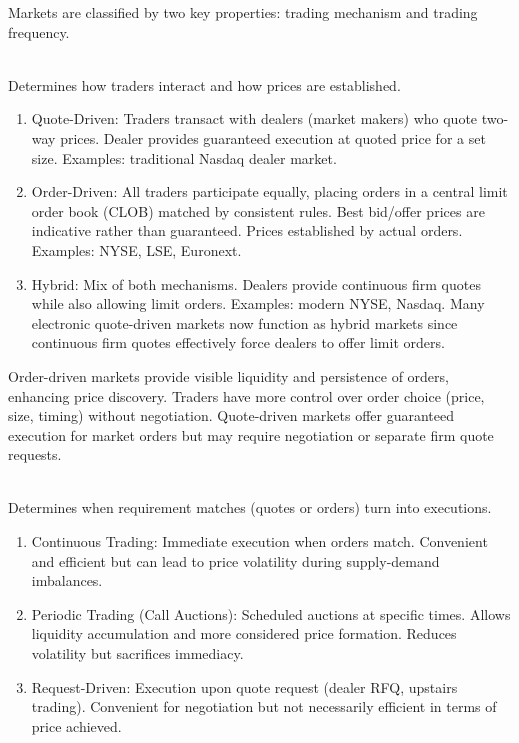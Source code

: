 Markets are classified by two key properties: trading mechanism and trading frequency.

\begin{definition} \\
Determines how traders interact and how prices are established.
\begin{enumerate}[label=\roman*.]
\setlength{\itemsep}{0pt}
\item Quote-Driven: Traders transact with dealers (market makers) who quote two-way prices. Dealer provides guaranteed execution at quoted price for a set size. Examples: traditional Nasdaq dealer market.
\item Order-Driven: All traders participate equally, placing orders in a central limit order book (CLOB) matched by consistent rules. Best bid/offer prices are indicative rather than guaranteed. Prices established by actual orders. Examples: NYSE, LSE, Euronext.
\item Hybrid: Mix of both mechanisms. Dealers provide continuous firm quotes while also allowing limit orders. Examples: modern NYSE, Nasdaq. Many electronic quote-driven markets now function as hybrid markets since continuous firm quotes effectively force dealers to offer limit orders.
\end{enumerate}
Order-driven markets provide visible liquidity and persistence of orders, enhancing price discovery. Traders have more control over order choice (price, size, timing) without negotiation. Quote-driven markets offer guaranteed execution for market orders but may require negotiation or separate firm quote requests.
\end{definition}

\begin{definition} \\
Determines when requirement matches (quotes or orders) turn into executions.
\begin{enumerate}[label=\roman*.]
\setlength{\itemsep}{0pt}
\item Continuous Trading: Immediate execution when orders match. Convenient and efficient but can lead to price volatility during supply-demand imbalances.
\item Periodic Trading (Call Auctions): Scheduled auctions at specific times. Allows liquidity accumulation and more considered price formation. Reduces volatility but sacrifices immediacy.
\item Request-Driven: Execution upon quote request (dealer RFQ, upstairs trading). Convenient for negotiation but not necessarily efficient in terms of price achieved.
\end{enumerate}
\end{definition}

